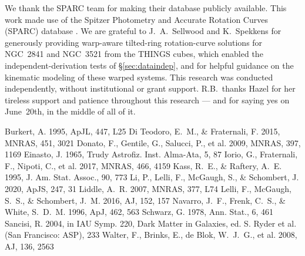 \documentclass[twocolumn]{aastex701}
\begin{document}
\begin{acknowledgments}
We thank the SPARC team for making their database publicly available. This
work made use of the Spitzer Photometry and Accurate Rotation Curves (SPARC)
database \citep{Lelli2016}. We are grateful to J.~A.\ Sellwood and
K.\ Spekkens for generously providing warp-aware tilted-ring rotation-curve
solutions for NGC~2841 and NGC~3521 from the THINGS cubes, which enabled the
independent-derivation tests of \S\ref{sec:dataindep}, and for helpful
guidance on the kinematic modeling of these warped systems. This research was
conducted independently, without institutional or grant support. R.B.\ thanks
Hazel for her tireless support and patience throughout this research --- and
for saying yes on June~20th, in the middle of all of it.
\end{acknowledgments}



\begin{thebibliography}{}
 Burkert, A. 1995, ApJL, 447, L25
 Di Teodoro, E.~M., \& Fraternali, F. 2015, MNRAS, 451, 3021
 Donato, F., Gentile, G., Salucci,
P., et al. 2009, MNRAS, 397, 1169
 Einasto, J. 1965, Trudy Astrofiz. Inst.
Alma-Ata, 5, 87
 Iorio, G., Fraternali, F., Nipoti, C., et al. 2017, MNRAS, 466, 4159
 Kass, R.~E., \& Raftery, A.~E. 1995, J. Am. Stat. Assoc., 90, 773
 Li, P., Lelli, F., McGaugh, S., \& Schombert, J. 2020, ApJS, 247, 31
 Liddle, A.~R. 2007, MNRAS, 377, L74
 Lelli, F., McGaugh, S.~S., \&
Schombert, J.~M. 2016, AJ, 152, 157
 Navarro, J.~F., Frenk, C.~S., \&
White, S.~D.~M. 1996, ApJ, 462, 563
 Schwarz, G. 1978, Ann. Stat., 6, 461
 Sancisi, R. 2004, in IAU Symp. 220,
Dark Matter in Galaxies, ed. S. Ryder et al. (San Francisco: ASP), 233
 Walter, F., Brinks, E., de Blok, W.~J.~G., et al. 2008, AJ, 136, 2563
\end{thebibliography}
\end{document}
